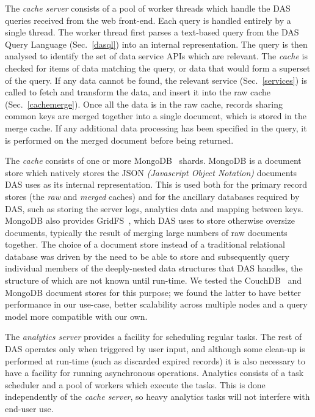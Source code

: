 \documentclass[a4paper]{jpconf}
\begin{document}
The \emph{cache server} consists of a pool of worker threads which handle the DAS queries received from the web front-end. Each query is handled entirely by a single thread. The worker thread first parses a text-based query from the DAS Query Language (Sec.~\ref{dasql}) into an internal representation. The query is then analysed to identify the set of data service APIs which are relevant. The \emph{cache} is checked for items of data matching the query, or data that would form a superset of the query. If any data cannot be found, the relevant service (Sec.~\ref{services}) is called to fetch and transform the data, and insert it into the raw cache (Sec.~\ref{cachemerge}). Once all the data is in the raw cache, records sharing common keys are merged together into a single document, which is stored in the merge cache. If any additional data processing has been specified in the query, it is performed on the merged document before being returned.

The \emph{cache} consists of one or more MongoDB~\cite{mongodb} shards. MongoDB is a document store which natively stores the JSON {\it (Javascript Object Notation)} documents DAS uses as its internal representation. This is used both for the primary record stores (the \emph{raw} and \emph{merged} caches) and for the ancillary databases required by DAS, such as storing the server logs, analytics data and mapping between keys. MongoDB also provides GridFS~\cite{gridfs}, which DAS uses to store otherwise oversize documents, typically the result of merging large numbers of raw documents together. The choice of a document store instead of a traditional relational database was driven by the need to be able to store and subsequently query individual members of the deeply-nested data structures that DAS handles, the structure of which are not known until run-time. We tested the CouchDB~\cite{couchdb} and MongoDB document stores for this purpose; we found the latter to have better performance in our use-case, better scalability across multiple nodes and a query model more compatible with our own.

The \emph{analytics server} provides a facility for scheduling regular tasks. The rest of DAS operates only when triggered by user input, and although some clean-up is performed at run-time (such as discarded expired records) it is also necessary to have a facility for running asynchronous operations. Analytics consists of a task scheduler and a pool of workers which execute the tasks. This is done independently of the \emph{cache server}, so heavy analytics tasks will not interfere with end-user use.
\end{document}
